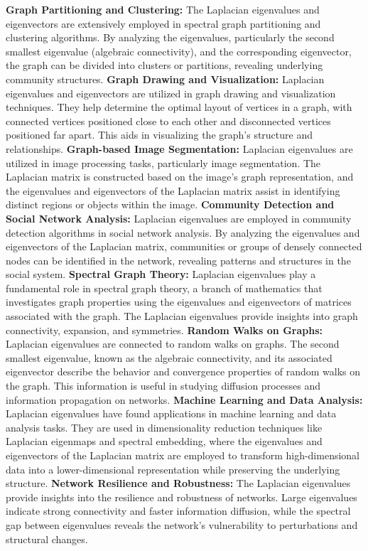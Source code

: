 \documentclass{article}
\begin{document}
\textbf {Graph Partitioning and Clustering:} The Laplacian eigenvalues and eigenvectors are extensively employed in spectral graph partitioning and clustering algorithms. By analyzing the eigenvalues, particularly the second smallest eigenvalue (algebraic connectivity), and the corresponding eigenvector, the graph can be divided into clusters or partitions, revealing underlying community structures.
\textbf {Graph Drawing and Visualization:} Laplacian eigenvalues and eigenvectors are utilized in graph drawing and visualization techniques. They help determine the optimal layout of vertices in a graph, with connected vertices positioned close to each other and disconnected vertices positioned far apart. This aids in visualizing the graph's structure and relationships.
\textbf {Graph-based Image Segmentation:} Laplacian eigenvalues are utilized in image processing tasks, particularly image segmentation. The Laplacian matrix is constructed based on the image's graph representation, and the eigenvalues and eigenvectors of the Laplacian matrix assist in identifying distinct regions or objects within the image.
\textbf {Community Detection and Social Network Analysis:} Laplacian eigenvalues are employed in community detection algorithms in social network analysis. By analyzing the eigenvalues and eigenvectors of the Laplacian matrix, communities or groups of densely connected nodes can be identified in the network, revealing patterns and structures in the social system.
\textbf {Spectral Graph Theory:} Laplacian eigenvalues play a fundamental role in spectral graph theory, a branch of mathematics that investigates graph properties using the eigenvalues and eigenvectors of matrices associated with the graph. The Laplacian eigenvalues provide insights into graph connectivity, expansion, and symmetries.
\textbf {Random Walks on Graphs:} Laplacian eigenvalues are connected to random walks on graphs. The second smallest eigenvalue, known as the algebraic connectivity, and its associated eigenvector describe the behavior and convergence properties of random walks on the graph. This information is useful in studying diffusion processes and information propagation on networks.
\textbf {Machine Learning and Data Analysis:} Laplacian eigenvalues have found applications in machine learning and data analysis tasks. They are used in dimensionality reduction techniques like Laplacian eigenmaps and spectral embedding, where the eigenvalues and eigenvectors of the Laplacian matrix are employed to transform high-dimensional data into a lower-dimensional representation while preserving the underlying structure.
\textbf {Network Resilience and Robustness:} The Laplacian eigenvalues provide insights into the resilience and robustness of networks. Large eigenvalues indicate strong connectivity and faster information diffusion, while the spectral gap between eigenvalues reveals the network's vulnerability to perturbations and structural changes.
\end{document}
